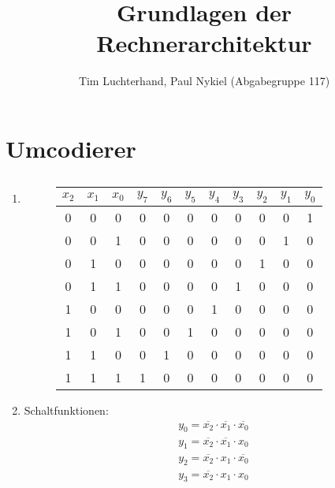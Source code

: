 \documentclass[DIN, pagenumber=false, fontsize=11pt, parskip=half]{scrartcl}
\title{Grundlagen der Rechnerarchitektur}
\author{Tim Luchterhand, Paul Nykiel (Abgabegruppe 117)}
\begin{document}
    \maketitle
    \section{Umcodierer}
    \subsection{}
    \begin{enumerate}[label=(\alph*)]
        \item
            \begin{figure}[H]
                \centering
                \begin{tabular}{ccc|cccccccc}
                    \toprule
                    $x_2$ &$x_1$ & $x_0$ & $y_7$ & $y_6$ & $y_5$ & $y_4$ & $y_3$ & $y_2$ & $y_1$ & $y_0$ \\
                    \midrule
                    0 & 0 & 0  &  0 & 0 & 0 & 0 & 0 & 0 & 0 & 1\\
                    0 & 0 & 1  &  0 & 0 & 0 & 0 & 0 & 0 & 1 & 0\\
                    0 & 1 & 0  &  0 & 0 & 0 & 0 & 0 & 1 & 0 & 0\\
                    0 & 1 & 1  &  0 & 0 & 0 & 0 & 1 & 0 & 0 & 0\\
                    1 & 0 & 0  &  0 & 0 & 0 & 1 & 0 & 0 & 0 & 0\\
                    1 & 0 & 1  &  0 & 0 & 1 & 0 & 0 & 0 & 0 & 0\\
                    1 & 1 & 0  &  0 & 1 & 0 & 0 & 0 & 0 & 0 & 0\\
                    1 & 1 & 1  &  1 & 0 & 0 & 0 & 0 & 0 & 0 & 0\\
                    \bottomrule
                \end{tabular}
            \end{figure}
        \item
            Schaltfunktionen:
            \begin{eqnarray*}
                y_0 = \overline{x_2} \cdot \overline{x_1} \cdot \overline{x_0} \\
                y_1 = \overline{x_2} \cdot \overline{x_1} \cdot x_0 \\
                y_2 = \overline{x_2} \cdot x_1 \cdot \overline{x_0} \\
                y_3 = \overline{x_2} \cdot x_1 \cdot x_0 \\

\end{eqnarray*}
\end{enumerate}
\end{document}

